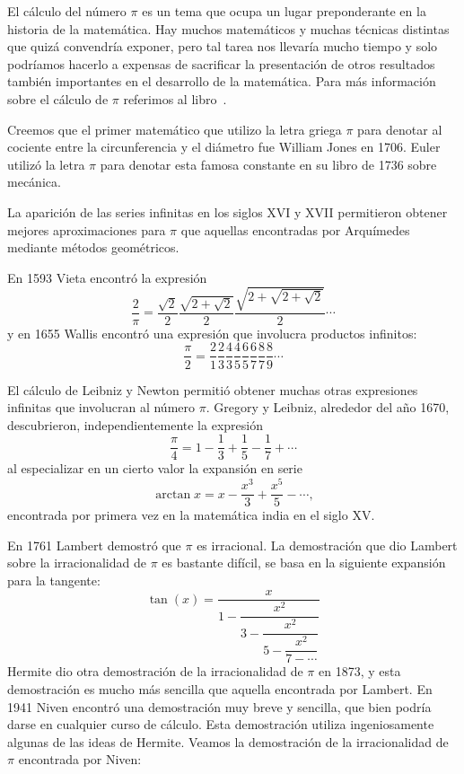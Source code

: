 El cálculo del número $\pi$ es un tema que ocupa un lugar preponderante en la
historia de la matemática. Hay muchos matemáticos y muchas técnicas distintas
que quizá convendría exponer, pero tal tarea nos llevaría mucho tiempo y solo
podríamos hacerlo a expensas de sacrificar la presentación de otros resultados
también importantes en el desarrollo de la matemática. Para más información
sobre el cálculo de $\pi$ referimos al libro~\cite{MR0449960}. 

Creemos que el primer matemático que utilizo la letra griega $\pi$ para denotar
al cociente entre la circunferencia y el diámetro fue William Jones en 1706.
Euler utilizó la letra $\pi$ para denotar esta famosa constante en su libro de
1736 sobre mecánica. 

La aparición de las series infinitas en los siglos XVI y XVII permitieron
obtener mejores aproximaciones para $\pi$ que aquellas encontradas por
Arquímedes mediante métodos geométricos. 

\label{Vieta}
\label{Wallis}
En 1593 Vieta encontró la
expresión
\[
	\frac{2}{\pi}=\dfrac{\sqrt{2}}{2}\dfrac{\sqrt{2+\sqrt{2}}}{2}\dfrac{\sqrt{2+\sqrt{2+\sqrt{2}}}}{2}\cdots
\]
y en 1655 Wallis encontró una expresión que involucra productos infinitos:
\[
	\frac{\pi}{2}=\frac21\frac23\frac43\frac45\frac65\frac67\frac87\frac89\cdots
\]

\label{LeibnizGregory}
El cálculo de Leibniz y Newton permitió obtener muchas otras expresiones
infinitas que involucran al número $\pi$. Gregory y Leibniz, alrededor del año
1670, descubrieron, independientemente la expresión
\[
	\frac{\pi}{4}=1-\frac13+\frac15-\frac17+\cdots
\]
al especializar en un cierto valor la expansión en serie 
\[
	\arctan x=x-\frac{x^3}{3}+\frac{x^5}{5}-\cdots,
\]
encontrada por primera vez en la matemática india en el siglo XV.

En 1761 Lambert demostró que $\pi$ es irracional.  La demostración que dio
Lambert sobre la irracionalidad de $\pi$ es bastante difícil, se basa en la
siguiente expansión para la tangente:
\[
	\tan(x)=\dfrac{x}{1-\dfrac{x^2}{3-\dfrac{x^2}{5-\dfrac{x^2}{7-\cdots}}}}
\]
Hermite dio otra demostración de la irracionalidad de $\pi$ en 1873, y esta
demostración es mucho más sencilla que aquella encontrada por Lambert. 
En 1941 Niven encontró una demostración muy breve y sencilla, que bien podría
darse en cualquier curso de cálculo. Esta demostración utiliza ingeniosamente
algunas de las ideas de Hermite. Veamos la demostración de la irracionalidad de
$\pi$ encontrada por Niven:

